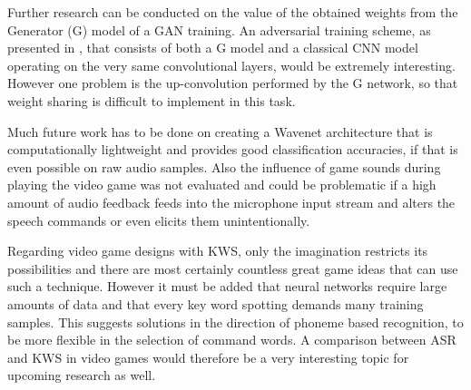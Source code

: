 Further research can be conducted on the value of the obtained weights from the Generator (G) model of a GAN training. 
An adversarial training scheme, as presented in \cite{Oezdenizci2020}, that consists of both a G model and a classical CNN model operating on the very same convolutional layers, would be extremely interesting. 
However one problem is the up-convolution performed by the G network, so that weight sharing is difficult to implement in this task.

Much future work has to be done on creating a Wavenet architecture that is computationally lightweight and provides good classification accuracies, if that is even possible on raw audio samples.
Also the influence of game sounds during playing the video game was not evaluated and could be problematic if a high amount of audio feedback feeds into the microphone input stream and alters the speech commands or even elicits them unintentionally.

Regarding video game designs with KWS, only the imagination restricts its possibilities and there are most certainly countless great game ideas that can use such a technique.
However it must be added that neural networks require large amounts of data and that every key word spotting demands many training samples.
This suggests solutions in the direction of phoneme based recognition, to be more flexible in the selection of command words.
A comparison between ASR and KWS in video games would therefore be a very interesting topic for upcoming research as well.